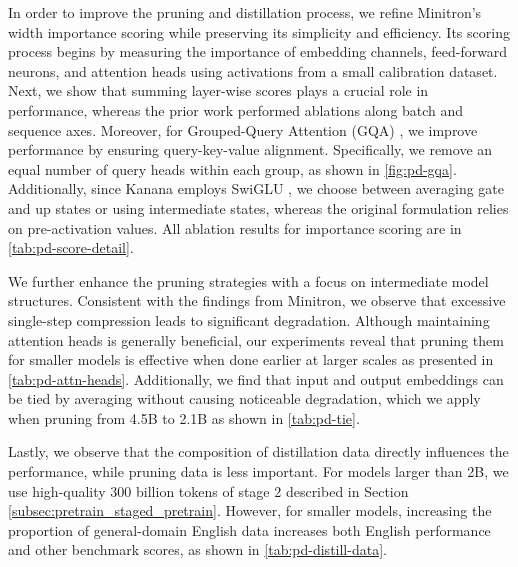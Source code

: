 In order to improve the pruning and distillation process, we refine Minitron's width importance scoring while preserving its simplicity and efficiency.
Its scoring process begins by measuring the importance of embedding channels, feed-forward neurons, and attention heads using activations from a small calibration dataset.
Next, we show that summing layer-wise scores plays a crucial role in performance, whereas the prior work performed ablations along batch and sequence axes.
Moreover, for Grouped-Query Attention (GQA) \citep{ainslie2023gqa}, we improve performance by ensuring query-key-value alignment. Specifically, we remove an equal number of query heads within each group, as shown in \autoref{fig:pd-gqa}.
Additionally, since Kanana employs SwiGLU \citep{swiglu}, we choose between averaging gate and up states or using intermediate states, whereas the original formulation relies on pre-activation values.
All ablation results for importance scoring are in \autoref{tab:pd-score-detail}.


We further enhance the pruning strategies with a focus on intermediate model structures.
Consistent with the findings from Minitron, we observe that excessive single-step compression leads to significant degradation.
Although maintaining attention heads is generally beneficial, our experiments reveal that pruning them for smaller models is effective when done earlier at larger scales as presented in \autoref{tab:pd-attn-heads}.
Additionally, we find that input and output embeddings can be tied by averaging without causing noticeable degradation, which we apply when pruning from 4.5B to 2.1B as shown in \autoref{tab:pd-tie}.


Lastly, we observe that the composition of distillation data directly influences the performance, while pruning data is less important.
For models larger than 2B, we use high-quality 300 billion tokens of stage 2 described in Section \ref{subsec:pretrain_staged_pretrain}.
However, for smaller models, increasing the proportion of general-domain English data increases both English performance and other benchmark scores, as shown in \autoref{tab:pd-distill-data}.

